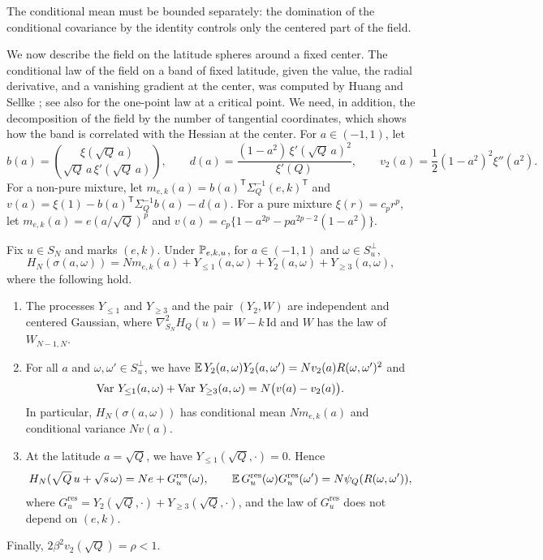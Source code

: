 The conditional mean must be bounded separately: the domination of the conditional covariance by the identity controls only the centered part of the field.

We now describe the field on the latitude spheres around a fixed center. The conditional law of the field on a band of fixed latitude, given the value, the radial derivative, and a vanishing gradient at the center, was computed by Huang and Sellke \cite[Lemma~3.11]{HuangSellke2024}; see also \cite{BenArousSubagZeitouni2020} for the one-point law at a critical point. We need, in addition, the decomposition of the field by the number of tangential coordinates, which shows how the band is correlated with the Hessian at the center. For $a\in(-1,1)$, let
\begin{equation}\label{eq:mb-bd}
b(a)=\binom{\xi(\sqrt Q\,a)}{\sqrt Q\,a\,\xi'(\sqrt Q\,a)},\qquad d(a)=\frac{(1-a^2)\,\xi'(\sqrt Q\,a)^2}{\xi'(Q)},\qquad v_2(a)=\frac12(1-a^2)^2\xi''(a^2).
\end{equation}
For a non-pure mixture, let $m_{e,k}(a)=b(a)^{\mathsf T}\Sigma_Q^{-1}(e,k)^{\mathsf T}$ and $v(a)=\xi(1)-b(a)^{\mathsf T}\Sigma_Q^{-1}b(a)-d(a)$. For a pure mixture $\xi(r)=c_pr^p$, let $m_{e,k}(a)=e(a/\sqrt Q)^p$ and $v(a)=c_p\{1-a^{2p}-pa^{2p-2}(1-a^2)\}$.

\begin{lemma}\label{lem:mb-regression}
Fix $u\in S_N$ and marks $(e,k)$. Under $\mathbb P_{e,k,u}$, for $a\in(-1,1)$ and $\omega\in S_u^\perp$,
\begin{equation}\label{eq:mb-banks}
H_N(\sigma(a,\omega))=Nm_{e,k}(a)+Y_{\le1}(a,\omega)+Y_2(a,\omega)+Y_{\ge3}(a,\omega),
\end{equation}
where the following hold.
\begin{enumerate}
\item The processes $Y_{\le1}$ and $Y_{\ge3}$ and the pair $(Y_2,W)$ are independent and centered Gaussian, where $\nabla^2_{S_N}H_Q(u)=W-k\,\mathrm{Id}$ and $W$ has the law of $W_{N-1,N}$.
\item For all $a$ and $\omega,\omega'\in S_u^\perp$, we have $\mathbb E\,Y_2(a,\omega)Y_2(a,\omega')=Nv_2(a)R(\omega,\omega')^2$ and
\[
\operatorname{Var}\,Y_{\le1}(a,\omega)+\operatorname{Var}\,Y_{\ge3}(a,\omega)=N\bigl(v(a)-v_2(a)\bigr).
\]
In particular, $H_N(\sigma(a,\omega))$ has conditional mean $Nm_{e,k}(a)$ and conditional variance $Nv(a)$.
\item At the latitude $a=\sqrt Q$, we have $Y_{\le1}(\sqrt Q,\cdot)=0$. Hence
\begin{equation}\label{eq:mb-section}
H_N(\sqrt Q\,u+\sqrt s\,\omega)=Ne+G^{\mathrm{res}}_u(\omega),\qquad \mathbb E\,G^{\mathrm{res}}_u(\omega)G^{\mathrm{res}}_u(\omega')=N\psi_Q(R(\omega,\omega')),
\end{equation}
where $G^{\mathrm{res}}_u=Y_2(\sqrt Q,\cdot)+Y_{\ge3}(\sqrt Q,\cdot)$, and the law of $G^{\mathrm{res}}_u$ does not depend on $(e,k)$.
\end{enumerate}
Finally, $2\beta^2v_2(\sqrt Q)=\rho<1$.
\end{lemma}

